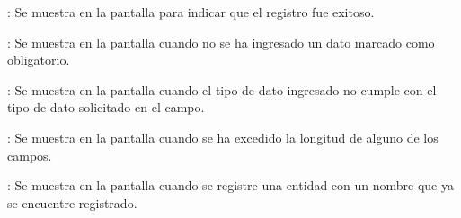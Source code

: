 \begin{Citemize}
	\item {}: Se muestra en la pantalla  para indicar que el registro fue exitoso.
	\item {}: Se muestra en la pantalla  cuando no se ha ingresado un dato marcado como obligatorio.
	\item {}: Se muestra en la pantalla  cuando el tipo de dato ingresado no cumple con el tipo de dato solicitado en el campo.
	\item {}: Se muestra en la pantalla  cuando se ha excedido la longitud de alguno de los campos.
	\item {}: Se muestra en la pantalla  cuando se registre una entidad con un nombre que ya se encuentre registrado.
\end{Citemize}

